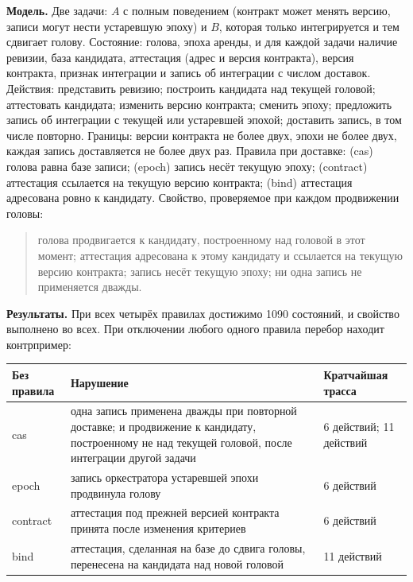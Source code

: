 \documentclass[11pt,a4paper]{article}
\begin{document}
\textbf{Модель.} Две задачи: $A$ с полным поведением (контракт может менять версию, записи могут нести устаревшую эпоху) и $B$, которая только интегрируется и тем сдвигает голову. Состояние: голова, эпоха аренды, и для каждой задачи наличие ревизии, база кандидата, аттестация (адрес и версия контракта), версия контракта, признак интеграции и запись об интеграции с числом доставок. Действия: представить ревизию; построить кандидата над текущей головой; аттестовать кандидата; изменить версию контракта; сменить эпоху; предложить запись об интеграции с текущей или устаревшей эпохой; доставить запись, в том числе повторно. Границы: версии контракта не более двух, эпохи не более двух, каждая запись доставляется не более двух раз. Правила при доставке: (cas) голова равна базе записи; (epoch) запись несёт текущую эпоху; (contract) аттестация ссылается на текущую версию контракта; (bind) аттестация адресована ровно к кандидату. Свойство, проверяемое при каждом продвижении головы:

\begin{quote}
голова продвигается к кандидату, построенному над головой в этот момент; аттестация адресована к этому кандидату и ссылается на текущую версию контракта; запись несёт текущую эпоху; ни одна запись не применяется дважды.
\end{quote}

\textbf{Результаты.} При всех четырёх правилах достижимо 1090 состояний, и свойство выполнено во всех. При отключении любого одного правила перебор находит контрпример:

\begin{center}
\small
\begin{tabular}{p{2.0cm} p{6.4cm} p{4.6cm}}
\toprule
Без правила & Нарушение & Кратчайшая трасса \\
\midrule
cas & одна запись применена дважды при повторной доставке; и продвижение к кандидату, построенному не над текущей головой, после интеграции другой задачи & 6 действий; 11 действий \\
epoch & запись оркестратора устаревшей эпохи продвинула голову & 6 действий \\
contract & аттестация под прежней версией контракта принята после изменения критериев & 6 действий \\
bind & аттестация, сделанная на базе до сдвига головы, перенесена на кандидата над новой головой & 11 действий \\
\bottomrule
\end{tabular}
\end{center}
\end{document}
